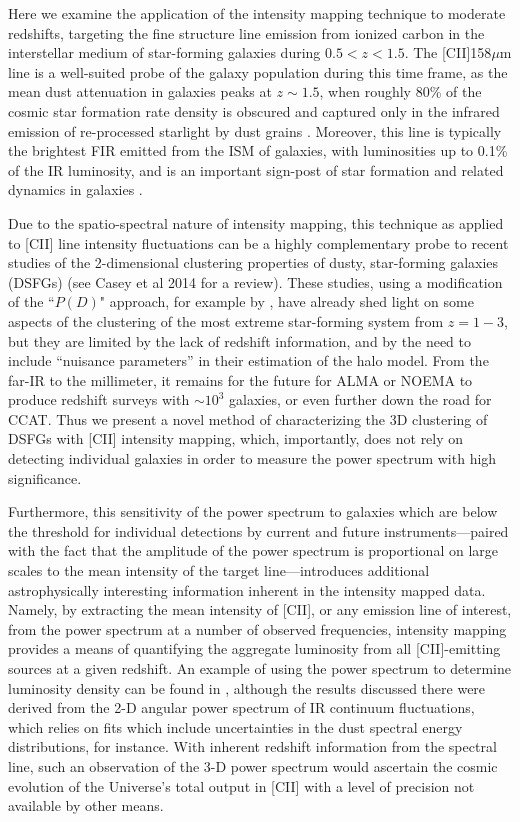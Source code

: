 \documentclass[12pt,preprint]{emulateapj}
\begin{document}
Here we examine the application of the intensity mapping technique to moderate redshifts, targeting the fine structure line emission from ionized carbon in the interstellar medium of star-forming galaxies during $0.5 < z < 1.5$. The [CII]158$\mu$m line is a well-suited probe of the galaxy population during this time frame, as the mean dust attenuation in galaxies peaks at $z \sim 1.5$, when roughly 80\% of the cosmic star formation rate density is obscured and captured only in the infrared emission of re-processed starlight by dust grains \citep{burgarella13}. Moreover, this line is typically the brightest FIR emitted from the ISM of galaxies, with luminosities up to 0.1\% of the IR luminosity, and is an important sign-post of star formation and related dynamics in galaxies \cite{gracia-carpio11, sargsyan12, diaz-santos13}.

Due to the spatio-spectral nature of intensity mapping, this technique as applied to [CII] line intensity fluctuations can be a highly complementary probe to recent studies of the 2-dimensional clustering properties of dusty, star-forming galaxies (DSFGs) (see Casey et al 2014 for a review). These studies, using a modification of the ``$P(D)$" approach, for example by \citep{bethermin11,viero13}, have already shed light on some aspects of the clustering of the most extreme star-forming system from $z = 1- 3$, but they are limited by the lack of redshift information, and by the need to include ``nuisance parameters'' in their estimation of the halo model. From the far-IR to the millimeter, it remains for the future for ALMA or NOEMA to produce redshift surveys with $\sim10^3$ galaxies, or even further down the road for CCAT. Thus we present a novel method of characterizing the 3D clustering of DSFGs with [CII] intensity mapping, which, importantly, does not rely on detecting individual galaxies in order to measure the power spectrum with high significance. 

Furthermore, this sensitivity of the power spectrum to galaxies which are below the threshold for individual detections by current and future instruments---paired with the fact that the amplitude of the power spectrum is proportional on large scales to the mean intensity of the target line---introduces additional astrophysically interesting information inherent in the intensity mapped data. Namely, by extracting the mean intensity of [CII], or any emission line of interest, from the power spectrum at a number of observed frequencies, intensity mapping provides a means of quantifying the aggregate luminosity from all [CII]-emitting sources at a given redshift. An example of using the power spectrum to determine luminosity density can be found in \citet{planckXXX}, although the results discussed there were derived from the 2-D angular power spectrum of IR continuum fluctuations, which relies on fits which include uncertainties in the dust spectral energy distributions, for instance. With inherent redshift information from the spectral line, such an observation of the 3-D power spectrum would ascertain the cosmic evolution of the Universe's total output in [CII] with a level of precision not available by other means. 
\end{document}
